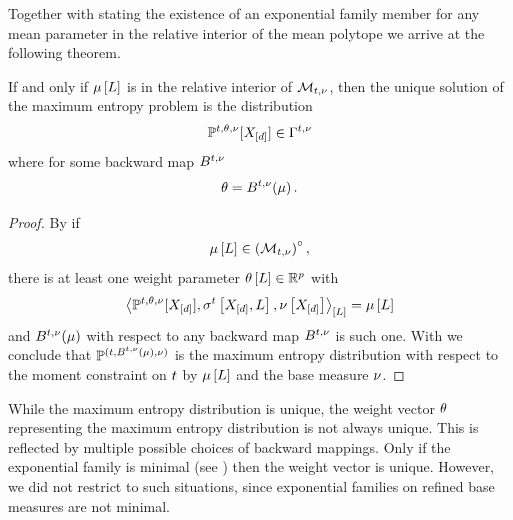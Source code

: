 Together with  stating the existence of an exponential family member for any mean parameter in the relative interior of the mean polytope we arrive at the following theorem.

\begin{theorem}
    \label{the:maxEntropyInterior}
    If and only if $\mu\left[L\right]$ is in the relative interior of $\mathcal{M}_{t,\nu}$, then the unique solution of the maximum entropy problem is the distribution
    \begin{align*}
        \mathbb{P}^{t,\theta,\nu}[X_{[d]}]\in\Gamma^{t,\nu}
    \end{align*}
    where for some backward map $B^{t,\nu}$
    \begin{align*}
        \theta
        = B^{t,\nu}(\mu) \, .
    \end{align*}
\end{theorem}
\begin{proof}
    By  if
    \begin{align*}
        \mu\left[L\right] \in {\left(\mathcal{M}_{t,\nu}\right)}^{\circ}  \, ,
    \end{align*}
    there is at least one weight parameter $\theta\left[L\right]\in\mathbb{R}^{p}$ with
    \begin{align*}
        \left\langle \mathbb{P}^{t,\theta,\nu}[X_{[d]}],\sigma^{t}\left[X_{[d]},L\right],\nu\left[X_{[d]}\right]\right\rangle_{\left[ L \right]}
        =\mu\left[L\right]
    \end{align*}
    and $B^{t,\nu}(\mu)$ with respect to any backward map $B^{t,\nu}$ is such one.
    With  we conclude that $\mathbb{P}^{(t,B^{t,\nu}(\mu),\nu)}$ is the maximum entropy distribution with respect to the moment constraint on $t$ by $\mu\left[L\right]$ and the base measure $\nu$.
\end{proof}

While the maximum entropy distribution is unique, the weight vector $\theta$ representing the maximum entropy distribution is not always unique.
This is reflected by multiple possible choices of backward mappings.
Only if the exponential family is minimal (see \cite{wainwright_graphical_2008}) then the weight vector is unique.
However, we did not restrict to such situations, since exponential families on refined base measures are not minimal.